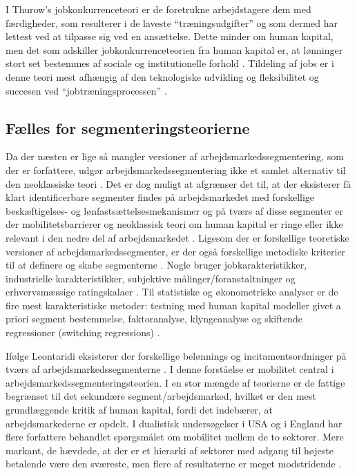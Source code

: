 I Thurow's jobkonkurrenceteori er de foretrukne arbejdstagere dem med færdigheder, som resulterer i de laveste “træningsudgifter” og som dermed har lettest ved at tilpasse sig ved en ansættelse. Dette minder om human kapital, men det som adskiller jobkonkurrenceteorien fra human kapital er, at lønninger stort set bestemmes af sociale og institutionelle forhold \parencite[1221]{Cain1976}. Tildeling af jobs er i denne teori mest afhængig af den teknologiske udvikling og fleksibilitet og succesen ved “jobtræningsprocessen” \parencite[74]{Leontaridi1998}.


\subsection{Fælles for segmenteringsteorierne}

Da der næsten er lige så mangler versioner af arbejdsmarkedssegmentering, som der er forfattere, udgør arbejdsmarkedssegmentering ikke et samlet alternativ til den neoklassiske teori \parencite[77]{Leontaridi1998}. Det er dog muligt at afgrænser det til, at der eksisterer få klart identificerbare segmenter findes på arbejdsmarkedet med forskellige beskæftigelses- og lønfastsættelsesmekanismer og på tværs af disse segmenter er der mobilitetsbarrierer og neoklassisk teori om human kapital er ringe eller ikke relevant i den nedre del af arbejdsmarkedet \parencite[78]{Leontaridi1998}. Ligesom der er forskellige teoretiske versioner af arbejdsmarkedssegmenter, er der også forskellige metodiske kriterier til at definere og skabe segmenterne \parencite[78]{Leontaridi1998}. Nogle bruger jobkarakteristikker, industrielle karakteristikker, subjektive målinger/foranstaltninger og erhvervsmæssige ratingskalaer \parencite[79]{Leontaridi1998}. Til statistiske og økonometriske analyser er de fire mest karakteristiske metoder: testning med human kapital modeller givet a priori segment bestemmelse, faktoranalyse, klyngeanalyse og skiftende regressioner (switching regressions) \parencite[80]{Leontaridi1998}.

Ifølge Leontaridi eksisterer der forskellige belønnings
og incitamentsordninger på tværs af arbejdsmarkedssegmenterne \parencite[92]{Leontaridi1998}. I denne forståelse er mobilitet central i arbejdsmarkedssegmenteringsteorien. I en stor mængde af teorierne er de fattige begrænset til det sekundære segment/arbejdsmarked, hvilket er den mest grundlæggende kritik af human kapital, fordi det indebærer, at arbejdsmarkederne er opdelt. I dualistisk undersøgelser i USA og i England har flere forfattere behandlet spørgsmålet om mobilitet mellem de to sektorer. Mere markant, de hævdede, at der er et hierarki af sektorer med adgang til højeste betalende være den sværeste, men flere af resultaterne er meget modstridende \parencite[93]{Leontaridi1998}.

